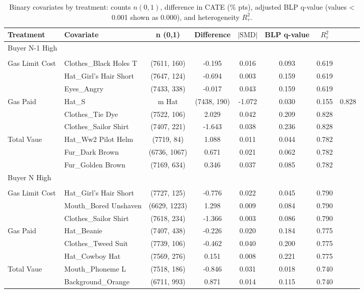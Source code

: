 \begin{table}
\caption{Binary covariates by treatment: counts $n(0,1)$, difference in CATE (\% pts), adjusted BLP q-value (values < 0.001 shown as 0.000), and heterogeneity $R^2_{\tau}$.}
\label{tab:m2_cate_binary}
\begin{tabular}{llccccc}
\toprule
Treatment & Covariate & n (0,1) & Difference & $|\mathrm{SMD}|$ & BLP q-value & $R^2_{\tau}$ \\
\midrule
Buyer N-1 High &  &  &  &  &  &  \\
 &  &  &  &  &  &  \\
Gas Limit Cost & Clothes\_Black Holes T & (7611, 160) & -0.195 & 0.016 & 0.093 & 0.619 \\
 & Hat\_Girl's Hair Short & (7647, 124) & -0.694 & 0.003 & 0.159 & 0.619 \\
 & Eyes\_Angry & (7433, 338) & -0.017 & 0.043 & 0.159 & 0.619 \\
Gas Paid & Hat\_S&m Hat & (7438, 190) & -1.072 & 0.030 & 0.155 & 0.828 \\
 & Clothes\_Tie Dye & (7522, 106) & 2.029 & 0.042 & 0.209 & 0.828 \\
 & Clothes\_Sailor Shirt & (7407, 221) & -1.643 & 0.038 & 0.236 & 0.828 \\
Total Vaue & Hat\_Ww2 Pilot Helm & (7719, 84) & 1.088 & 0.011 & 0.044 & 0.782 \\
 & Fur\_Dark Brown & (6736, 1067) & 0.671 & 0.021 & 0.062 & 0.782 \\
 & Fur\_Golden Brown & (7169, 634) & 0.346 & 0.037 & 0.085 & 0.782 \\
Buyer N High &  &  &  &  &  &  \\
 &  &  &  &  &  &  \\
Gas Limit Cost & Hat\_Girl's Hair Short & (7727, 125) & -0.776 & 0.022 & 0.045 & 0.790 \\
 & Mouth\_Bored Unshaven & (6629, 1223) & 1.298 & 0.009 & 0.084 & 0.790 \\
 & Clothes\_Sailor Shirt & (7618, 234) & -1.366 & 0.003 & 0.086 & 0.790 \\
Gas Paid & Hat\_Beanie & (7407, 438) & -0.226 & 0.020 & 0.184 & 0.775 \\
 & Clothes\_Tweed Suit & (7739, 106) & -0.462 & 0.040 & 0.200 & 0.775 \\
 & Hat\_Cowboy Hat & (7569, 276) & 0.151 & 0.008 & 0.221 & 0.775 \\
Total Vaue & Mouth\_Phoneme L & (7518, 186) & -0.846 & 0.031 & 0.018 & 0.740 \\
 & Background\_Orange & (6711, 993) & 0.871 & 0.014 & 0.115 & 0.740 \\

\end{tabular}
\end{table}
